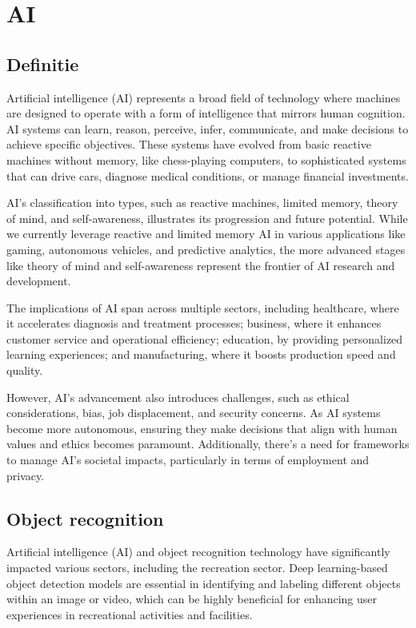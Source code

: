 \section{AI}
\subsection{Definitie}

Artificial intelligence (AI) represents a broad field of technology where machines are designed to operate with a form of intelligence that mirrors human cognition. AI systems can learn, reason, perceive, infer, communicate, and make decisions to achieve specific objectives. These systems have evolved from basic reactive machines without memory, like chess-playing computers, to sophisticated systems that can drive cars, diagnose medical conditions, or manage financial investments.

AI's classification into types, such as reactive machines, limited memory, theory of mind, and self-awareness, illustrates its progression and future potential. While we currently leverage reactive and limited memory AI in various applications like gaming, autonomous vehicles, and predictive analytics, the more advanced stages like theory of mind and self-awareness represent the frontier of AI research and development.

The implications of AI span across multiple sectors, including healthcare, where it accelerates diagnosis and treatment processes; business, where it enhances customer service and operational efficiency; education, by providing personalized learning experiences; and manufacturing, where it boosts production speed and quality\autocite{HJALTALIN2024101914}.

However, AI's advancement also introduces challenges, such as ethical considerations, bias, job displacement, and security concerns. As AI systems become more autonomous, ensuring they make decisions that align with human values and ethics becomes paramount. Additionally, there's a need for frameworks to manage AI's societal impacts, particularly in terms of employment and privacy.

\subsection{Object recognition}
Artificial intelligence (AI) and object recognition technology have significantly impacted various sectors, including the recreation sector. Deep learning-based object detection models are essential in identifying and labeling different objects within an image or video, which can be highly beneficial for enhancing user experiences in recreational activities and facilities.

